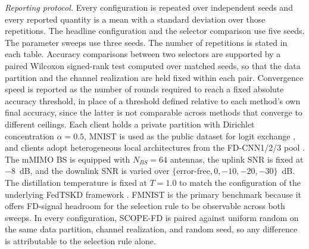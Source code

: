 \documentclass[journal]{IEEEtran}
\newcommand{\rev}[1]{#1}
\begin{document}
\rev{\textit{Reporting protocol.} Every configuration is repeated over independent seeds and every reported quantity is a mean with a standard deviation over those repetitions. The headline configuration and the selector comparison use five seeds. The parameter sweeps use three seeds. The number of repetitions is stated in each table. Accuracy comparisons between two selectors are supported by a paired Wilcoxon signed-rank test computed over matched seeds, so that the data partition and the channel realization are held fixed within each pair. Convergence speed is reported as the number of rounds required to reach a fixed absolute accuracy threshold, in place of a threshold defined relative to each method's own final accuracy, since the latter is not comparable across methods that converge to different ceilings.} Each client holds a private partition with Dirichlet concentration $\alpha = 0.5$, MNIST is used as the public dataset for logit exchange \cite{itahara2023distillation}, and clients adopt heterogeneous local architectures from the FD-CNN1/2/3 pool \cite{chan2021fedhe}. The mMIMO BS is equipped with $N_{BS} = 64$ antennas, the uplink SNR is fixed at $-8$~dB, and the downlink SNR is varied over $\{\text{error-free}, 0, -10, -20, -30\}$~dB. The distillation temperature is fixed at $T = 1.0$ to match the configuration of the underlying FedTSKD framework \cite{mu2024fedtskd}.%
FMNIST is the primary benchmark because it offers FD-signal headroom for the selection rule to be observable across both sweeps.%
In every configuration, SCOPE-FD is paired against uniform random on the same data partition, channel realization, and random seed, so any difference is attributable to the selection rule alone. %
\end{document}
